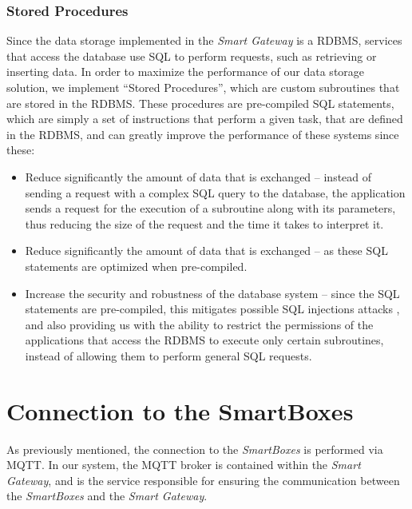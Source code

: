 \subsubsection{Stored Procedures}

Since the data storage implemented in the \textit{Smart Gateway} is a \acs{RDBMS}, services that access the database use \acf{SQL} to perform requests, such as retrieving or inserting data. In order to maximize the performance of our data storage solution, we implement ``Stored Procedures'', which are custom subroutines that are stored in the \acs{RDBMS}. These procedures are pre-compiled \acs{SQL} statements, which are simply a set of instructions that perform a given task, that are defined in the \acs{RDBMS}, and can greatly improve the performance of these systems since these:

\begin{itemize}
    \item Reduce significantly the amount of data that is exchanged -- instead of sending a request with a complex \acs{SQL} query to the database, the application sends a request for the execution of a subroutine along with its parameters, thus reducing the size of the request and the time it takes to interpret it.
    \item Reduce significantly the amount of data that is exchanged -- as these \acs{SQL} statements are optimized when pre-compiled.
    \item Increase the security and robustness of the database system -- since the \acs{SQL} statements are pre-compiled, this mitigates possible \acs{SQL} injections attacks \cite{clarke2012sql}, and also providing us with the ability to restrict the permissions of the applications that access the \acs{RDBMS} to execute only certain subroutines, instead of allowing them to perform general \acs{SQL} requests.
\end{itemize}


\section{Connection to the SmartBoxes}


As previously mentioned, the connection to the \textit{SmartBoxes} is performed via \acs{MQTT}. In our system, the \acs{MQTT} broker is contained within the \textit{Smart Gateway}, and is the service responsible for ensuring the communication between the \textit{SmartBoxes} and the \textit{Smart Gateway}.

